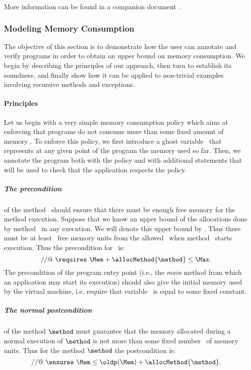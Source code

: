More information can be found in a companion document~\cite{gmg05:sefm}.

\subsubsection{Modeling Memory Consumption}\label{sec:verif}
The objective of this section is to demonstrate how the user can
annotate and verify programs in order to obtain an upper bound on
memory consumption. We begin by describing the principles of our
approach, then turn to establish its soundness, and finally show
how it can be applied to non-trivial examples involving recursive
methods and exceptions.


\paragraph{Principles}
Let us begin with a very simple memory consumption policy which aims
at enforcing that  programs do not consume more than
some fixed amount of memory \Max . To enforce this policy, we first
introduce a ghost variable \Mem\ that represents at any given point of
the program the memory used so far. Then, we annotate the program both
with the policy and with additional statements that will be used to
check that the application respects the policy.



\subparagraph{The precondition} of the method \method\ should ensure
that there must be enough free memory for the method
execution. Suppose that we know an upper bound of the allocations done
by method \method\ in any execution. We will denote this upper
bound by \allocMethod{\method}. Thus there must be at least
\allocMethod{\method}\ free memory units from the allowed \Max\ when
method \method\ starts execution. Thus the precondition for \method\ is:
$$
//@ \ \requires \ \Mem + \allocMethod{\method}  \leq \Max.
$$
The precondition of the program entry point (i.e., the \textit{main} 
method from which an application may start its execution) should 
also give the initial memory used by the virtual machine, i.e.
require that variable \Mem\ is equal to some fixed constant.

\subparagraph{The normal postcondition} of the method $\method$ must
guarantee that the memory allocated during a normal execution of
$\method$ is not more than some fixed number \allocMethod{\method}\
of memory units. Thus for the method $\method$ the postcondition is:
$$
//@ \ \ensures \ \Mem \leq \oldp(\Mem) + \allocMethod{\method}.
$$

